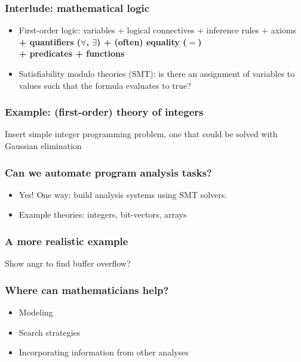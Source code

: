 \documentclass[11pt]{beamer}
\begin{document}
\begin{frame}
  \frametitle{Interlude: mathematical logic}
  \begin{itemize}
  \item{First-order logic: variables + logical connectives 
    + inference rules + axioms \textbf{+ quantifiers ($\forall$, $\exists$) 
      + (often) equality ($=$) \\ 
      + predicates + functions} }
    \medskip
  \item{Satisfiability modulo theories (SMT): is there an assignment of variables to values such that the formula evaluates to true?}
  \end{itemize}
\end{frame}

\begin{frame}
  \frametitle{Example: (first-order) theory of integers}
  Insert simple integer programming problem, one that could be solved with Gaussian elimination
\end{frame}


 \begin{frame}
\frametitle{Can we automate program analysis tasks?}
\begin{itemize}
  \item{Yes! One way: build analysis systems using SMT solvers.}
    \medskip
  \item{Example theories: integers, bit-vectors, arrays}
      \end{itemize}
  \end{frame}

  \begin{frame}
\frametitle{A more realistic example}
  Show angr to find buffer overflow?
  \end{frame}

\begin{frame}
\frametitle{Where can mathematicians help?}
\begin{itemize}
\item{Modeling}
  \medskip
\item{Search strategies}
  \medskip
\item{Incorporating information from other analyses}
  \end{itemize}
\end{frame}
\end{document}
